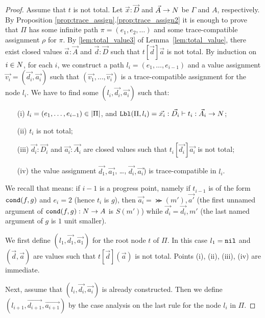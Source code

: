 \begin{proof}
  Assume that $t$ is not total. 
  Let $\vec{x}:\vec{D}$ and $\vec{A}\rightarrow{N}$ be $\Gamma$ and $A$, respectively.
  By Proposition \ref{prop:trace_assign}.\ref{prop:trace_assign2} it is enough to prove that
  $\Pi$ has some infinite path $\pi=(e_1, e_2, \ldots)$ 
  and some trace-compatible assignment $\rho$ for $\pi$.
  By \ref{lem:total_value3} of Lemma~\ref{lem:total_value},
  there exist closed values $\vec{a}:\vec{A}$ and $\vec{d}:\vec{D}$ such that
  $t[\vec{d}]\vec{a}$ is not total. 
  By induction on $i \in {N}$, for each $i$, we construct a path $l_i = (e_1,\ldots,e_{i-1})$
  and a value assignment $\vec{v_i} = (\vec{d_i},\vec{a_i})$ such that
  $(\vec{v_1},\ldots,\vec{v_i})$ is a trace-compatible assignment for the node $l_i$. 
  We have to find some $(l_i,\vec{d_i},\vec{a_i})$ such that:
  \begin{itemize}
  \item[(i)]
   $l_i = (e_1, \ldots, e_{i-1}) \in {|\Pi|}$, 
     and ${\tt Lbl}(\Pi,l_i) = \vec{x_{i}}:\vec{D_{i}}\vdash t_{i} : \vec{A_{i}}\rightarrow{N}$; 
  \item[(ii)]
    $t_{i}$ is not total;
  \item[(iii)]
    $\vec{d_{i}}:\vec{D_i}$ and $\vec{a_i}:\vec{A_i}$ are closed values
    such that $t_{i}[\vec{d_i}]\vec{a_i}$ is not total;
  \item[(iv)]
    the value assignment 
    $\vec{d_1},\vec{a_1}$, \ldots, $\vec{d_i},\vec{a_i}$) is trace-compatible in $l_i$.
  \end{itemize}
  
 We recall that  means: 
 if $i-1$ is a progress point, namely if $t_{i-1}$ is of the form ${\tt cond}(f,g)$ and $e_i=2$ 
    (hence $t_i$ is $g$),
    then $\vec{a_i} = \Succ(m'),\vec{a'}$ 
     (the first unnamed argument of ${\tt cond}(f,g):{N} \rightarrow A$ is $S(m')$)
     while $\vec{d_i} = \vec{d_i},m'$ 
     (the last named argument of $g$ is $1$ unit smaller).

  We first define $(l_1,\vec{d_1},\vec{a_1})$ for the root node $t$ of $\Pi$.
  In this case $l_1 = {\tt nil}$ 
   and $(\vec{d},\vec{a})$ are values such that $t[\vec{d}](\vec{a})$ is not total.
  Points (i), (ii), (iii), (iv) are immediate.

  Next, assume that $(l_i,\vec{d_i},\vec{a_i})$ is already constructed.
  Then we define $(l_{i+1},\vec{d_{i+1}},\vec{a_{i+1}})$ by the case analysis on
  the last rule for the node $l_i$ in $\Pi$. 


\end{proof}
